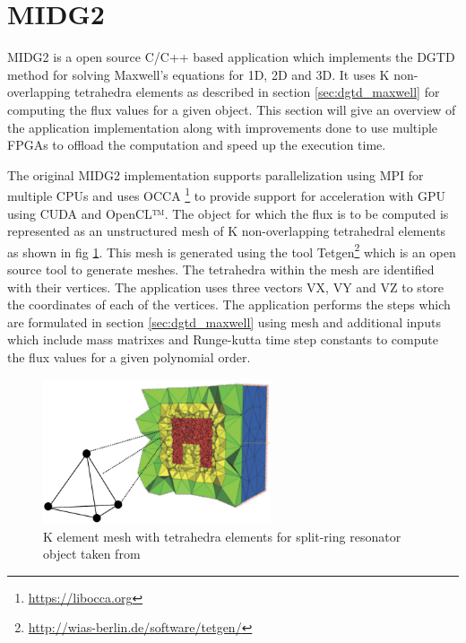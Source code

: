 \section{\acf{MIDG2}}
\label{sec:midg2_base}

\ac{MIDG2} is a open source C/C++ based application which implements the \ac{DGTD} method for solving
Maxwell's equations for 1D, 2D and 3D. It uses K non-overlapping tetrahedra elements as described in
section \ref{sec:dgtd_maxwell} for computing the flux values for a given object. This section
will give an overview of the application implementation along with improvements done to use
multiple FPGAs to offload the computation and speed up the execution time.

The original MIDG2 implementation supports parallelization using \ac{MPI} for multiple CPUs and
uses OCCA \footnote{\url{https://libocca.org}} to provide support for acceleration with GPU
using CUDA and OpenCL™. The object for which the flux is to be computed is represented as
an unstructured mesh of K non-overlapping tetrahedral elements as shown in fig \ref{fig:mesh}.
This mesh is generated using the tool Tetgen\footnote{\url{http://wias-berlin.de/software/tetgen/}}
which is an open source tool to generate meshes. The tetrahedra within the mesh are
identified with their vertices. The application uses three vectors VX, VY and VZ
to store the coordinates of each of the vertices. The application performs the steps
which are formulated in section \ref{sec:dgtd_maxwell} using mesh and additional
inputs which include mass matrixes and Runge-kutta time step constants to compute the
flux values for a given polynomial order.
\begin{figure}[h]%
    \centering
    \includegraphics[width=0.6\textwidth]{images/mesh}
    \caption{K element mesh with tetrahedra elements for split-ring resonator object taken from \cite{forstner_discontinuous_nodate}}
    \label{fig:mesh}
\end{figure}

